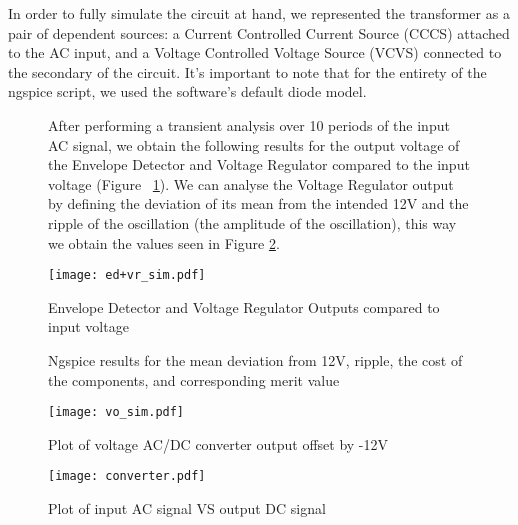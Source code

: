 \hspace{12pt} In order to fully simulate the circuit at hand, we represented the transformer as a pair of dependent sources: a Current Controlled Current Source (CCCS) attached to the AC input, and a Voltage Controlled Voltage Source (VCVS) connected to the secondary of the circuit. It's important to note that for the entirety of the ngspice script, we used the software's default diode model.
\vspace{-8pt}
\begin{figure}[h]
	\begin{minipage}[t]{.45\textwidth}
		\vspace{0pt}
		\hspace{12pt} After performing a transient analysis over 10 periods of the input AC signal, we obtain the following results for the output voltage of the Envelope Detector and Voltage Regulator compared to the input voltage (Figure ~\ref{fig:ed_vr}). We can analyse the Voltage Regulator output by defining the deviation of its mean from the intended 12V and the ripple of the oscillation (the amplitude of the oscillation), this way we obtain the values seen in Figure \ref{fig:sim_results}.
	\end{minipage}
	\begin{minipage}[t]{.5\textwidth}
		\vspace{0pt}
        	\centering
        	\texttt{[image: ed+vr\_sim.pdf]}
        	\caption{Envelope Detector and Voltage Regulator Outputs compared to input voltage}
        	\label{fig:ed_vr}
	\end{minipage}
\end{figure}

\begin{figure}[h]
	\centering
	\caption{Ngspice results for the mean deviation from 12V, ripple, the cost of the components, and corresponding merit value}
	\label{fig:sim_results}
\end{figure}

\begin{figure}[h]
	\centering
	\texttt{[image: vo\_sim.pdf]}
	\caption{Plot of voltage AC/DC converter output offset by -12V}
	\label{fig:sim_vo}
\end{figure}

\begin{figure}[h]
	\centering
	\texttt{[image: converter.pdf]}
	\caption{Plot of input AC signal VS output DC signal}
	\label{fig:sim_converter}
\end{figure}
\pagebreak

